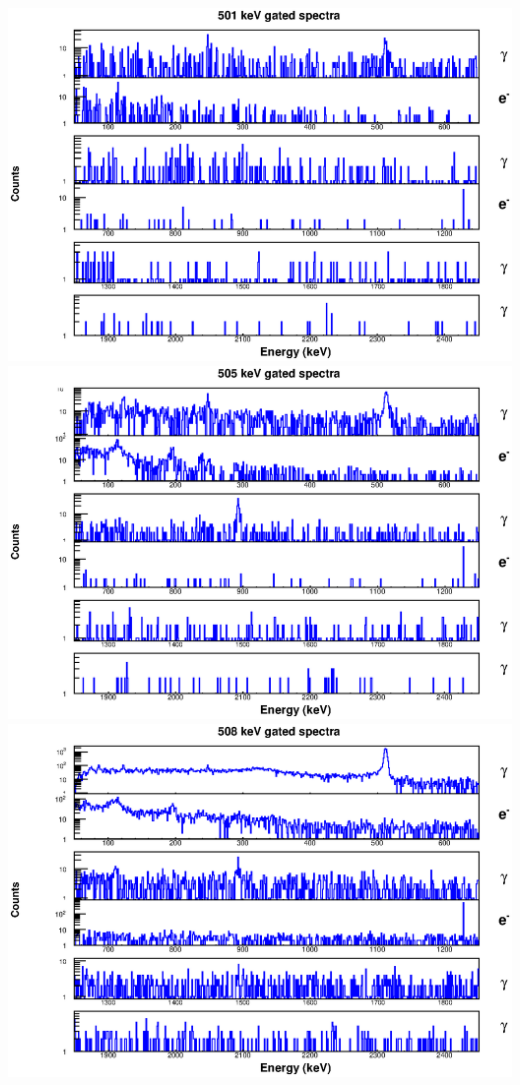 \begin{landscape}
\includegraphics[scale=1.1]{154Gd_Appendix/501_combined.eps}
\includegraphics[scale=1.1]{154Gd_Appendix/505_combined.eps}
\includegraphics[scale=1.1]{154Gd_Appendix/508_combined.eps}

\end{landscape}

